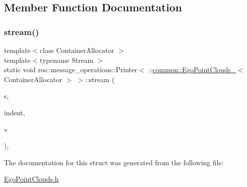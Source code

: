 \subsection{Member Function Documentation}
\mbox{\label{structros_1_1message__operations_1_1Printer_3_01_1_1common_1_1EgoPointClouds___3_01ContainerAllocator_01_4_01_4_a7715c59d93329b3b8d953ec1dfbb963c}} 
\subsubsection{\texorpdfstring{stream()}{stream()}}
{\footnotesize\ttfamily template$<$class Container\+Allocator $>$ \\
template$<$typename Stream $>$ \\
static void ros\+::message\+\_\+operations\+::\+Printer$<$ \+::\hyperlink{structcommon_1_1EgoPointClouds__}{common\+::\+Ego\+Point\+Clouds\+\_\+}$<$ Container\+Allocator $>$ $>$\+::stream (\begin{DoxyParamCaption}\item[{Stream \&}]{s,  }\item[{const std\+::string \&}]{indent,  }\item[{const \+::\hyperlink{structcommon_1_1EgoPointClouds__}{common\+::\+Ego\+Point\+Clouds\+\_\+}$<$ Container\+Allocator $>$ \&}]{v }\end{DoxyParamCaption})\hspace{0.3cm}{\ttfamily [inline]}, {\ttfamily [static]}}



The documentation for this struct was generated from the following file\+:\begin{DoxyCompactItemize}
\item 
\hyperlink{EgoPointClouds_8h}{Ego\+Point\+Clouds.\+h}\end{DoxyCompactItemize}

